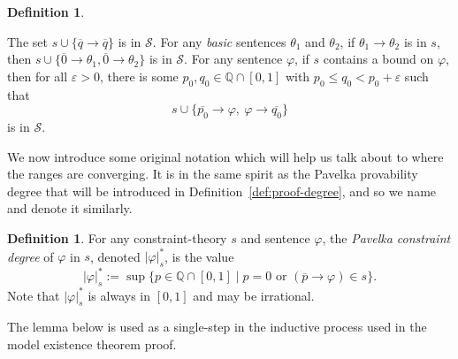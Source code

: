 \documentclass{amsart}
\theoremstyle{definition}
\newtheorem{definition}[theorem]{Definition}
\numberwithin{equation}{theorem}
\renewcommand{\phi}{\varphi}
\renewcommand{\epsilon}{\varepsilon}
\newcommand{\Q}{\mathbb{Q}}
\newcommand{\where}{\mid}
\newcommand{\rat}[1]{{\overline{#1}}}
\newcommand{\narrow}[1]{\xrightarrow{#1}}
\renewcommand{\to}{\narrow{}}
\begin{document}
\begin{definition}
\begin{enumerate}[label=(CP\arabic*)]
  \litem{$\Q$-Rule}\label{itm:cp-rule-q}
    The set $s\cup\{\rat q\to\rat q\}$ is in $\mathscr{S}$.
  \label{itm:cp-rule-intro}
    For any \emph{basic} sentences $\theta_1$ and $\theta_2$, if $\theta_1\to\theta_2$ is in $s$, then $s\cup\{\rat 0\to\theta_1,\rat 0\to\theta_2\}$ is in $\mathscr{S}$.
  \label{itm:cp-rule-narrowing}
    For any sentence $\phi$, if $s$ contains a bound on $\phi$, then for all $\epsilon>0$, there is some $p_0,q_0\in\Q\cap[0,1]$ with $p_0\leq q_0< p_0+\epsilon$ such that
    \[
      s\cup\{\rat{p_0}\to\phi,\ \phi\to\rat{q_0}\}
    \]
    is in $\mathscr{S}$.
	\end{enumerate}
\end{definition}

We now introduce some original notation which will help us talk about to where the ranges are converging.
It is in the same spirit as the Pavelka provability degree that will be introduced in Definition~\ref{def:proof-degree}, and so we name and denote it similarly.
\begin{definition}
  For any constraint-theory $s$ and sentence $\phi$, the \emph{Pavelka constraint degree} of $\phi$ in $s$, denoted $|\phi|^*_s$, is the value
  \[
    |\phi|^*_s:=\sup\{p\in\Q\cap[0,1]\where\text{$p=0$ or $(\rat p\to\phi)\in s$}\}.
  \]
  Note that $|\phi|^*_s$ is always in $[0,1]$ and may be irrational.
\end{definition}
The lemma below is used as a single-step in the inductive process used in the model existence theorem proof.
\end{document}
